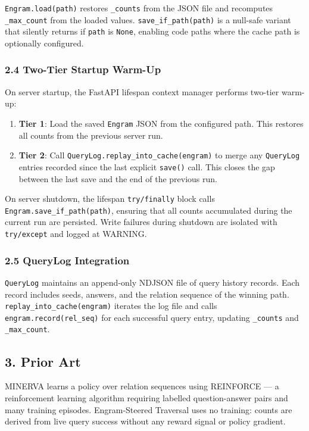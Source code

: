 \texttt{Engram.load(path)} restores \texttt{\_counts} from the JSON file and recomputes \texttt{\_max\_count} from the loaded values. \texttt{save\_if\_path(path)} is a null-safe variant that silently returns if \texttt{path} is \texttt{None}, enabling code paths where the cache path is optionally configured.

\subsubsection*{2.4 Two-Tier Startup Warm-Up}
On server startup, the FastAPI lifespan context manager performs two-tier warm-up:

\begin{enumerate}
  \item \textbf{Tier 1}: Load the saved \texttt{Engram} JSON from the configured path. This restores all counts from the previous server run.
  \item \textbf{Tier 2}: Call \texttt{QueryLog.replay\_into\_cache(engram)} to merge any \texttt{QueryLog} entries recorded since the last explicit \texttt{save()} call. This closes the gap between the last save and the end of the previous run.
\end{enumerate}


On server shutdown, the lifespan \texttt{try/finally} block calls \texttt{Engram.save\_if\_path(path)}, ensuring that all counts accumulated during the current run are persisted. Write failures during shutdown are isolated with \texttt{try/except} and logged at WARNING.

\subsubsection*{2.5 QueryLog Integration}
\texttt{QueryLog} maintains an append-only NDJSON file of query history records. Each record includes seeds, answers, and the relation sequence of the winning path. \texttt{replay\_into\_cache(engram)} iterates the log file and calls \texttt{engram.record(rel\_seq)} for each successful query entry, updating \texttt{\_counts} and \texttt{\_max\_count}.

\subsection*{3. Prior Art}
MINERVA \cite{das2018minerva} learns a policy over relation sequences using REINFORCE --- a reinforcement learning algorithm requiring labelled question-answer pairs and many training episodes. Engram-Steered Traversal uses no training: counts are derived from live query success without any reward signal or policy gradient.

